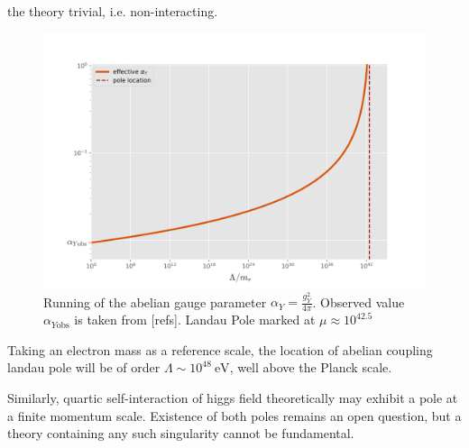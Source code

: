 \documentclass[11pt, a4paper]{article}
\begin{document}
the theory trivial, i.e. non-interacting.
\begin{figure}[H]
    \includegraphics[width=1\textwidth]{../plotr.jpg}
    \caption{Running of the abelian gauge parameter $\alpha_Y = \frac{g_Y^2}{4\pi}$. Observed value $\alpha_{Y\text{obs}}$ is taken from [refs]. 
    Landau Pole marked at $\mu \approx 10^{42.5}$}
    \label{boxes}
\end{figure} 
Taking an electron mass as a reference scale, the location of abelian coupling landau pole will be of order $\Lambda \sim 10^{48} \ \text{eV}$, well above the Planck scale.

Similarly, quartic self-interaction of higgs field theoretically may exhibit a pole at a finite momentum scale.
Existence of both poles remains an open question, but a theory containing any such singularity cannot be fundamental.


\end{document}

